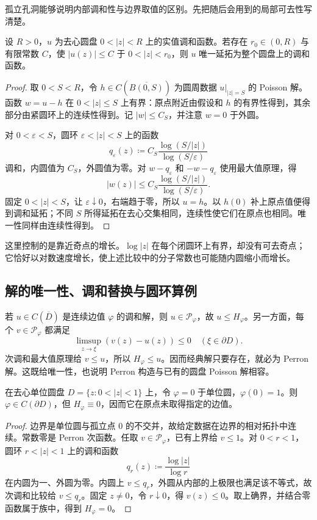 \ProseParagraphBreak
孤立孔洞能够说明内部调和性与边界取值的区别。先把随后会用到的局部可去性写清楚。

\begin{proposition}[有界调和孤立奇点可去]\label{b3:prop:16-harmonic-removable}
设 \(R>0\)，\(u\) 为去心圆盘 \(0<|z|<R\) 上的实值调和函数。若存在 \(r_0\in(0,R)\) 与有限常数 \(C\)，使 \(|u(z)|\le C\) 于 \(0<|z|<r_0\)，则 \(u\) 唯一延拓为整个圆盘上的调和函数。
\end{proposition}
\begin{proof}
取 \(0<S<R\)，令 \(h\in C(\overline{B(0,S)})\) 为圆周数据 \(u|_{|z|=S}\) 的 Poisson 解。函数 \(w=u-h\) 在 \(0<|z|\le S\) 上有界：原点附近由假设和 \(h\) 的有界性得到，其余部分由紧圆环上的连续性得到。记 \(|w|\le C_S\)，并注意 \(w=0\) 于外圆。

对 \(0<\varepsilon<S\)，圆环 \(\varepsilon<|z|<S\) 上的函数
\[
 q_\varepsilon(z)\coloneqq
 C_S\frac{\log(S/|z|)}{\log(S/\varepsilon)}
\]
调和，内圆值为 \(C_S\)，外圆值为零。对 \(w-q_\varepsilon\) 和 \(-w-q_\varepsilon\) 使用最大值原理，得
\[
 |w(z)|\le C_S\frac{\log(S/|z|)}{\log(S/\varepsilon)}.
\]
固定 \(0<|z|<S\)，让 \(\varepsilon\downarrow0\)，右端趋于零，所以 \(u=h\)。以 \(h(0)\) 补上原点值便得到调和延拓；不同 \(S\) 所得延拓在去心交集相同，连续性使它们在原点也相同。唯一性同样由连续性得到。
\end{proof}

这里控制的是靠近奇点的增长。\(\log|z|\) 在每个闭圆环上有界，却没有可去奇点；它恰好以对数速度增长，使上述比较中的分子常数也可能随内圆缩小而增长。

\subsection{解的唯一性、调和替换与圆环算例}
\label{b3:subsec:160204}

若 \(u\in C(\overline D)\) 是连续边值 \(\varphi\) 的调和解，则 \(u\in\mathcal P_\varphi\)，故 \(u\le H_\varphi\)。另一方面，每个 \(v\in\mathcal P_\varphi\) 都满足
\[
 \limsup_{z\to\xi}(v(z)-u(z))\le0
 \quad(\xi\in\partial D).
\]
次调和最大值原理给 \(v\le u\)，所以 \(H_\varphi\le u\)。因而经典解只要存在，就必为 Perron 解。这既给唯一性，也说明 Perron 构造与已有的圆盘 Poisson 解相容。

\begin{proposition}[孤立边界点的失效]\label{b3:exmp:16-punctured-disk}
在去心单位圆盘 \(D=\{z:0<|z|<1\}\) 上，令 \(\varphi=0\) 于单位圆，\(\varphi(0)=1\)。则 \(\varphi\in C(\partial D)\)，但 \(H_\varphi\equiv0\)，因而它在原点未取得指定的边值。
\end{proposition}
\begin{proof}
边界是单位圆与孤立点 \(0\) 的不交并，故给定数据在边界的相对拓扑中连续。常数零是 Perron 次函数。任取 \(v\in\mathcal P_\varphi\)，已有上界给 \(v\le1\)。对 \(0<r<1\)，圆环 \(r<|z|<1\) 上的调和函数
\[
 q_r(z)\coloneqq\frac{\log|z|}{\log r}
\]
在内圆为一、外圆为零。内圆上 \(v\le q_r\)，外圆从内部的上极限也满足该不等式，故次调和比较给 \(v\le q_r\)。固定 \(z\ne0\)，令 \(r\downarrow0\)，得 \(v(z)\le0\)。取上确界，并结合零函数属于族中，得到 \(H_\varphi=0\)。
\end{proof}

